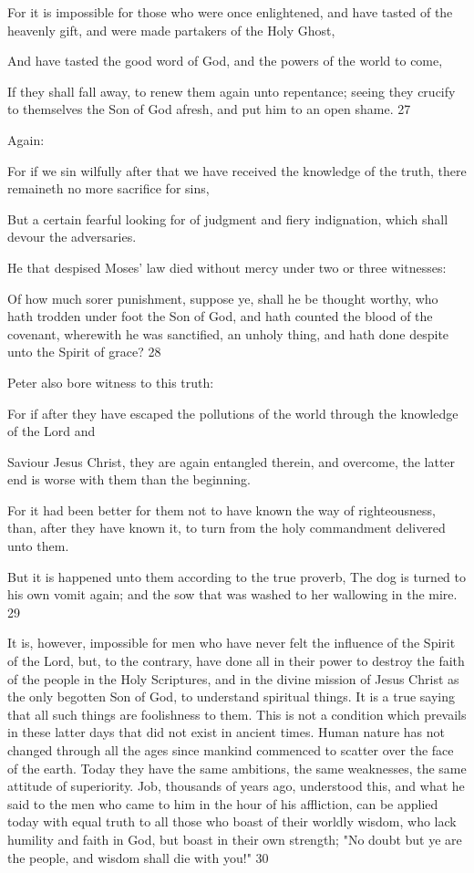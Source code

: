 For it is impossible for those who were once enlightened, and have tasted of the heavenly
gift, and were made partakers of the Holy Ghost,

And have tasted the good word of God, and the powers of the world to come,

If they shall fall away, to renew them again unto repentance; seeing they crucify to
themselves the Son of God afresh, and put him to an open shame. 27

Again:

For if we sin wilfully after that we have received the knowledge of the truth, there remaineth
no more sacrifice for sins,

But a certain fearful looking for of judgment and fiery indignation, which shall devour the
adversaries.

He that despised Moses' law died without mercy under two or three witnesses:

Of how much sorer punishment, suppose ye, shall he be thought worthy, who hath trodden
under foot the Son of God, and hath counted the blood of the covenant, wherewith he was
sanctified, an unholy thing, and hath done despite unto the Spirit of grace? 28

Peter also bore witness to this truth:

For if after they have escaped the pollutions of the world through the knowledge of the Lord
and

Saviour Jesus Christ, they are again entangled therein, and overcome, the latter end is worse
with them than the beginning.

For it had been better for them not to have known the way of righteousness, than, after they
have known it, to turn from the holy commandment delivered unto them.

But it is happened unto them according to the true proverb, The dog is turned to his own
vomit again; and the sow that was washed to her wallowing in the mire. 29

It is, however, impossible for men who have never felt the influence of the Spirit of the Lord,
but, to the contrary, have done all in their power to destroy the faith of the people in the Holy
Scriptures, and in the divine mission of Jesus Christ as the only begotten Son of God, to
understand spiritual things. It is a true saying that all such things are foolishness to them.
This is not a condition which prevails in these latter days that did not exist in ancient times.
Human nature has not changed through all the ages since mankind commenced to scatter
over the face of the earth. Today they have the same ambitions, the same weaknesses, the
same attitude of superiority. Job, thousands of years ago, understood this, and what he said to
the men who came to him in the hour of his affliction, can be applied today with equal truth
to all those who boast of their worldly wisdom, who lack humility and faith in God, but boast
in their own strength; "No doubt but ye are the people, and wisdom shall die with you!" 30

